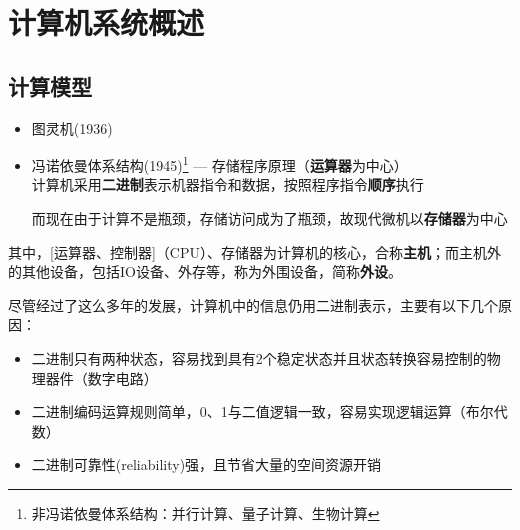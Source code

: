 
\section{计算机系统概述}
\subsection{计算模型}
\begin{itemize}
	\item 图灵机(1936)
	\item 冯诺依曼体系结构(1945)\footnote{非冯诺依曼体系结构：并行计算、量子计算、生物计算} --- 存储程序原理（\textbf{运算器}为中心）\\
	计算机采用\textbf{二进制}表示机器指令和数据，按照程序指令\textbf{顺序}执行
\begin{center}
\end{center}
而现在由于计算不是瓶颈，存储访问成为了瓶颈，故现代微机以\textbf{存储器}为中心
\begin{center}
\end{center}
\end{itemize}
\par 其中，[运算器、控制器]（CPU）、存储器为计算机的核心，合称\textbf{主机}；而主机外的其他设备，包括IO设备、外存等，称为外围设备，简称\textbf{外设}。

尽管经过了这么多年的发展，计算机中的信息仍用二进制表示，主要有以下几个原因：
\begin{itemize}
	\item 二进制只有两种状态，容易找到具有2个稳定状态并且状态转换容易控制的物理器件（数字电路）
	\item 二进制编码运算规则简单，0、1与二值逻辑一致，容易实现逻辑运算（布尔代数）
	\item 二进制可靠性(reliability)强，且节省大量的空间资源开销
\end{itemize}

